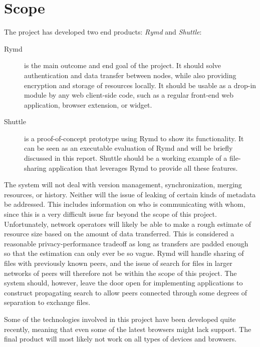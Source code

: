\section{Scope}

The project has developed two end products: \emph{Rymd} and \emph{Shuttle}:

\begin{description}
\item[Rymd] is the main outcome and end goal of the project. It should solve authentication and data transfer between nodes, while also providing encryption and storage of resources locally. It should be usable as a drop-in module by any web client-side code, such as a regular front-end web application, browser extension, or widget.

\item[Shuttle] is a proof-of-concept prototype using Rymd to show its functionality. It can be seen as an executable evaluation of Rymd and will be briefly discussed in this report. Shuttle should be a working example of a file-sharing application that leverages Rymd to provide all these features.
\end{description}

The system will not deal with version management, synchronization, merging resources, or history. Neither will the issue of leaking of certain kinds of metadata be addressed. This includes information on who is communicating with whom, since this is a very difficult issue far beyond the scope of this project. Unfortunately, network operators will likely be able to make a rough estimate of resource size based on the amount of data transferred. This is considered a reasonable privacy-performance tradeoff as long as transfers are padded enough so that the estimation can only ever be so vague. Rymd will handle sharing of files with previously known peers, and the issue of search for files in larger networks of peers will therefore not be within the scope of this project. The system should, however, leave the door open for implementing applications to construct propagating search to allow peers connected through some degrees of separation to exchange files.

Some of the technologies involved in this project have been developed quite recently, meaning that even some of the latest browsers might lack support. The final product will most likely not work on all types of devices and browsers.
